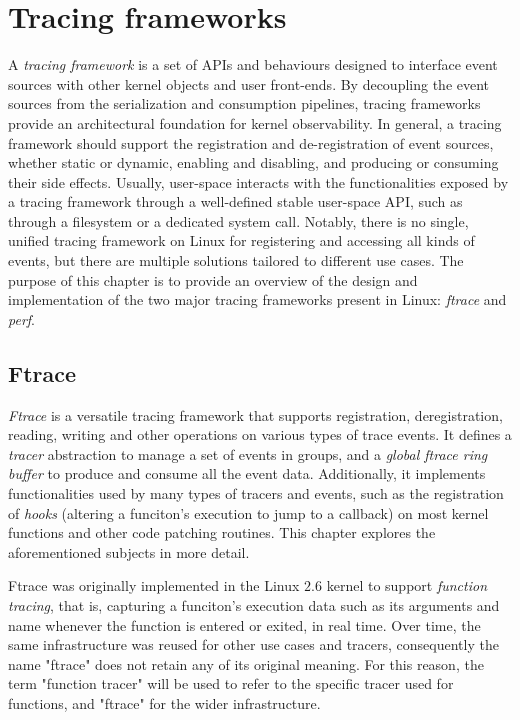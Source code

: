 \chapter{Tracing frameworks}

A \textit{tracing framework} is a set of APIs and behaviours designed to
interface event sources with other kernel objects and user front-ends. By
decoupling the event sources from the serialization and consumption pipelines,
tracing frameworks provide an architectural foundation for kernel observability.
In general, a tracing framework should support the registration and
de-registration of event sources, whether static or dynamic, enabling and
disabling, and producing or consuming their side effects. Usually, user-space
interacts with the functionalities exposed by a tracing framework through a
well-defined stable user-space API, such as through a filesystem or a dedicated
system call. Notably, there is no single, unified tracing framework on Linux for
registering and accessing all kinds of events, but there are multiple solutions
tailored to different use cases. The purpose of this chapter is to provide an
overview of the design and implementation of the two major tracing frameworks
present in Linux: \textit{ftrace} and \textit{perf}.

\section{Ftrace}

\textit{Ftrace} is a versatile tracing framework that supports registration,
deregistration, reading, writing and other operations on various types of trace
events. It defines a \textit{tracer} abstraction to manage a set of events in
groups, and a \textit{global ftrace ring buffer} to produce and consume all the
event data. Additionally, it implements functionalities used by many types of
tracers and events, such as the registration of \textit{hooks} (altering a
funciton's execution to jump to a callback) on most kernel functions and other
code patching routines. This chapter explores the aforementioned subjects in
more detail.

Ftrace was originally implemented in the Linux $2.6$ kernel to support
\textit{function tracing}, that is, capturing a funciton's execution data such
as its arguments and name whenever the function is entered or exited, in real
time. Over time, the same infrastructure was reused for other use cases and
tracers, consequently the name "ftrace" does not retain any of its original
meaning. For this reason, the term "function tracer" will be used to refer to
the specific tracer used for functions, and "ftrace" for the wider
infrastructure.

